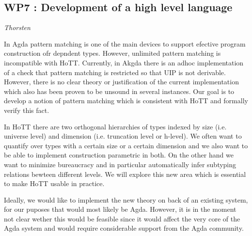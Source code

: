 \documentclass[twocolumn,a4paper,11pt]{article}
\begin{document}





  

\subsection*{WP7 : Development of a high level language} 

\emph{Thorsten}

In Agda pattern matching is one of the main devices to support
efective program construction ofr depndent types. However, unlimited
pattern matching is incompatible with HoTT. Currently, in Akgda there
is an adhoc implementation of a check that pattern matching is
restricted so that UIP is not derivable. However, there is no clear
theory or justification of the current implementation which also has
been proven to be unsound in several instances. Our goal is to develop
a notion of pattern matching which is consistent with HoTT and
formally verify this fact. 

In HoTT there are two orthogonal hierarchies of types indexed by size
(i.e. universe level) and dimension (i.e. truncation level or h-level). We often
want to quantify over types with a certain size or a certain dimension
and we also want to be able to implement construction parametric in
both. On the other hand we want to minimize bureaucracy and in
particular automatically infer subtyping relations bewteen different
levels. We will explore this new area which is essential to make HoTT
usable in practice.

Ideally, we would like to implement the new theory on back of an
existing system, for our puposes that would most likely be Agda. 
However, it is in the moment not clear wether this would be feasible
since it would affect the very core of the Agda system and would
require considerable support from the Agda community.
\end{document}
